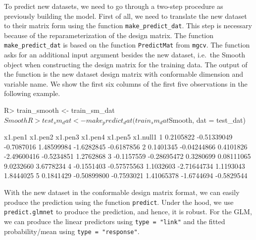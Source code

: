\documentclass[
]{jss}
\begin{document}
To predict new datasets, we need to go through a two-step procedure as
previously building the model. First of all, we need to translate the
new dataset to their matrix form using the function
\texttt{make\_predict\_dat}. This step is necessary because of the
reparameterization of the design matrix. The function
\texttt{make\_predict\_dat} is based on the function \texttt{PredictMat}
from \texttt{mgcv}. The function asks for an additional input argument
besides the new dataset, i.e.~the Smooth object when constructing the
design matrix for the training data. The output of the function is the
new dataset design matrix with conformable dimension and variable name.
We show the first six columns of the first five observations in the
following example.

\begin{CodeChunk}
\begin{CodeInput}
R> train_smooth <- train_sm_dat$Smooth
R> test_sm_dat <- make_predict_dat(train_sm_dat$Smooth, dat = test_dat)
\end{CodeInput}
\end{CodeChunk}

\begin{CodeChunk}
\begin{CodeOutput}
     x1.pen1     x1.pen2    x1.pen3     x1.pen4    x1.pen5   x1.null1
1  0.2105822 -0.51339049 -0.7087016  1.48599984 -1.6282845 -0.6187856
2  0.1401345 -0.04244866  0.4101826 -2.49600416 -0.5234851  1.2762868
3 -0.1157559 -0.28695472  0.3280699  0.08111065  9.0232660  3.6778234
4 -0.1551403 -0.57575563  1.1032603 -2.71644734  1.1193043  1.8444025
5  0.1841429 -0.50899800 -0.7593021  1.41065378 -1.6744694 -0.5829544
\end{CodeOutput}
\end{CodeChunk}

With the new dataset in the conformable design matrix format, we can
easily produce the prediction using the function \texttt{predict}. Under
the hood, we use \texttt{predict.glmnet} to produce the prediction, and
hence, it is robust. For the GLM, we can produce the linear predictors
using \texttt{type\ =\ "link"} and the fitted probability/mean using
\texttt{type\ =\ "response"}.

\begin{CodeChunk}
\end{CodeChunk}
\end{document}
